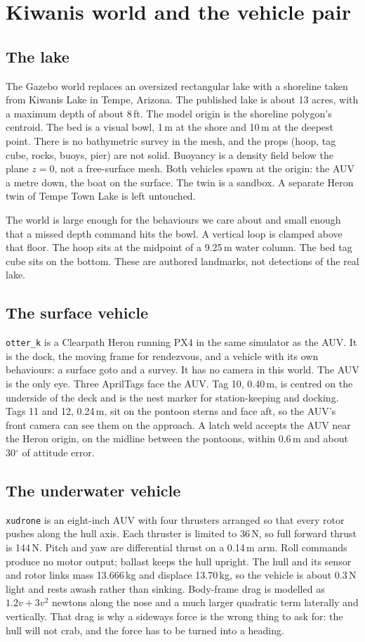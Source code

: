 \documentclass[conference]{IEEEtran}
\def\otterk{\texttt{otter\_k}}
\def\xudrone{\texttt{xudrone}}
\begin{document}
\section{Kiwanis world and the vehicle pair}
\label{sec:world}

\subsection{The lake}
The Gazebo world replaces an oversized rectangular lake with a shoreline taken from Kiwanis Lake in Tempe, Arizona. The published lake is about 13 acres, with a maximum depth of about 8\,ft. The model origin is the shoreline polygon's centroid. The bed is a visual bowl, 1\,m at the shore and 10\,m at the deepest point. There is no bathymetric survey in the mesh, and the props (hoop, tag cube, rocks, buoys, pier) are not solid. Buoyancy is a density field below the plane $z=0$, not a free-surface mesh. Both vehicles spawn at the origin: the AUV a metre down, the boat on the surface. The twin is a sandbox. A separate Heron twin of Tempe Town Lake is left untouched.

The world is large enough for the behaviours we care about and small enough that a missed depth command hits the bowl. A vertical loop is clamped above that floor. The hoop sits at the midpoint of a 9.25\,m water column. The bed tag cube sits on the bottom. These are authored landmarks, not detections of the real lake.

\subsection{The surface vehicle}
\otterk{} is a Clearpath Heron running PX4 in the same simulator as the AUV. It is the dock, the moving frame for rendezvous, and a vehicle with its own behaviours: a surface goto and a survey. It has no camera in this world. The AUV is the only eye. Three AprilTags face the AUV. Tag 10, 0.40\,m, is centred on the underside of the deck and is the nest marker for station-keeping and docking. Tags 11 and 12, 0.24\,m, sit on the pontoon sterns and face aft, so the AUV's front camera can see them on the approach. A latch weld accepts the AUV near the Heron origin, on the midline between the pontoons, within 0.6\,m and about 30$^\circ$ of attitude error.

\subsection{The underwater vehicle}
\xudrone{} is an eight-inch AUV with four thrusters arranged so that every rotor pushes along the hull axis. Each thruster is limited to 36\,N, so full forward thrust is 144\,N. Pitch and yaw are differential thrust on a 0.14\,m arm. Roll commands produce no motor output; ballast keeps the hull upright. The hull and its sensor and rotor links mass 13.666\,kg and displace 13.70\,kg, so the vehicle is about 0.3\,N light and rests awash rather than sinking. Body-frame drag is modelled as $1.2v + 3v^{2}$ newtons along the nose and a much larger quadratic term laterally and vertically. That drag is why a sideways force is the wrong thing to ask for: the hull will not crab, and the force has to be turned into a heading.
\end{document}
